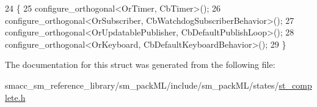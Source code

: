 \begin{DoxyCode}
24     \{
25         configure\_orthogonal<OrTimer, CbTimer>();   
26         configure\_orthogonal<OrSubscriber, CbWatchdogSubscriberBehavior>();
27         configure\_orthogonal<OrUpdatablePublisher, CbDefaultPublishLoop>();
28         configure\_orthogonal<OrKeyboard, CbDefaultKeyboardBehavior>();
29     \}
\end{DoxyCode}


The documentation for this struct was generated from the following file\+:\begin{DoxyCompactItemize}
\item 
smacc\+\_\+sm\+\_\+reference\+\_\+library/sm\+\_\+pack\+M\+L/include/sm\+\_\+pack\+M\+L/states/\hyperlink{st__complete_8h}{st\+\_\+complete.\+h}\end{DoxyCompactItemize}
